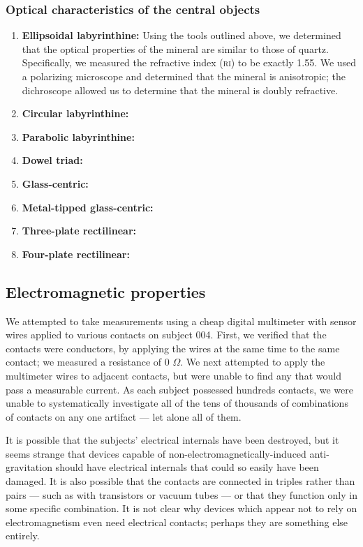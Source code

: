 \documentclass[10pt]{article}
\theoremstyle{definition}
\begin{document}
\subsubsection{Optical characteristics of the central objects}
\begin{enumerate}[(001)]
\item \textbf{Ellipsoidal labyrinthine:} Using the tools outlined above, we determined that the optical properties of the mineral are similar to those of quartz.
    Specifically, we measured the refractive index (\textsc{ri}) to be exactly 1.55.
    We used a polarizing microscope and determined that the mineral is anisotropic; the dichroscope allowed us to determine that the mineral is doubly refractive.
\item \textbf{Circular labyrinthine:}
\item \textbf{Parabolic labyrinthine:}
\item \textbf{Dowel triad:}
\item \textbf{Glass-centric:}
\item \textbf{Metal-tipped glass-centric:}
\item \textbf{Three-plate rectilinear:}
\item \textbf{Four-plate rectilinear:}
\end{enumerate}

\subsection{Electromagnetic properties}
We attempted to take measurements using a cheap digital multimeter with sensor wires applied to various contacts on subject 004.
First, we verified that the contacts were conductors, by applying the wires at the same time to the same contact; we measured a resistance of 0 $\Omega$.
We next attempted to apply the multimeter wires to adjacent contacts, but were unable to find any that would pass a measurable current.
As each subject possessed hundreds contacts, we were unable to systematically investigate all of the tens of thousands of combinations of contacts on any one artifact --- let alone all of them. 

It is possible that the subjects' electrical internals have been destroyed, but it seems strange that devices capable of non-electromagnetically-induced anti-gravitation should have electrical internals that could so easily have been damaged.
It is also possible that the contacts are connected in triples rather than pairs --- such as with transistors or vacuum tubes --- or that they function only in some specific combination.
It is not clear why devices which appear not to rely on electromagnetism even need electrical contacts; perhaps they are something else entirely.
\end{document}
